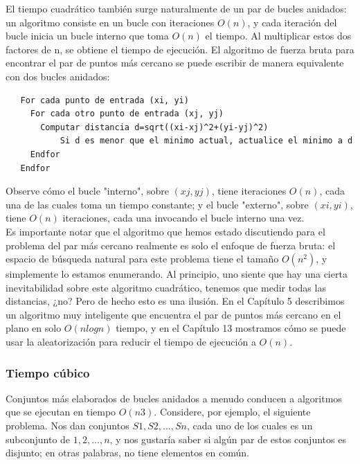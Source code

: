 \documentclass[a4paper, 12pt]{book}
\theoremstyle{dotless}
\begin{document}
El tiempo cuadrático también surge naturalmente de un par de bucles anidados: un algoritmo consiste en un bucle con iteraciones $O(n)$, y cada iteración del bucle inicia un bucle interno que toma $O(n)$ el tiempo. Al multiplicar estos dos factores de n, se obtiene el tiempo de ejecución. 
El algoritmo de fuerza bruta para encontrar el par de puntos más cercano se puede escribir de manera equivalente con dos bucles anidados:\\


\begin{lstlisting}
   For cada punto de entrada (xi, yi)
     For cada otro punto de entrada (xj, yj)
       Computar distancia d=sqrt((xi-xj)^2+(yi-yj)^2)
           Si d es menor que el minimo actual, actualice el minimo a d
     Endfor
   Endfor
\end{lstlisting}

Observe cómo el bucle "interno", sobre $(xj,yj)$, tiene iteraciones $O(n)$, cada una de las cuales toma un tiempo constante; y el bucle "externo", sobre $(xi,yi)$, tiene $O(n)$ iteraciones, cada una invocando el bucle interno una vez.\\

Es importante notar que el algoritmo que hemos estado discutiendo para el problema del par más cercano realmente es solo el enfoque de fuerza bruta: el espacio de búsqueda natural para este problema tiene el tamaño $O(n^2)$, y simplemente lo estamos enumerando. Al principio, uno siente que hay una cierta inevitabilidad sobre este algoritmo cuadrático, tenemos que medir todas las distancias, ¿no? Pero de hecho esto es una ilusión. En el Capítulo 5 describimos un algoritmo muy inteligente que encuentra el par de puntos más cercano en el plano en solo $O(nlogn)$ tiempo, y en el Capítulo 13 mostramos cómo se puede usar la aleatorización para reducir el tiempo de ejecución a $O(n)$.\\

\subsubsection*{Tiempo cúbico} 

Conjuntos más elaborados de bucles anidados a menudo conducen a algoritmos que se ejecutan en tiempo $O(n3)$. Considere, por ejemplo, el siguiente problema. Nos dan conjuntos $S1, S2, ..., Sn$, cada uno de los cuales es un subconjunto de ${1, 2,. . . , n}$, y nos gustaría saber si algún par de estos conjuntos es disjunto; en otras palabras, no tiene elementos en común.\\
\end{document}
